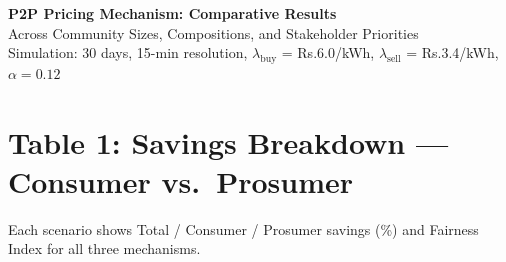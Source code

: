 \documentclass[11pt]{article}
\newcommand{\Rs}{Rs.}
\begin{document}
\begin{center}
{\LARGE \textbf{P2P Pricing Mechanism: Comparative Results}}\\[0.3cm]
{\large Across Community Sizes, Compositions, and Stakeholder Priorities}\\[0.2cm]
{\small Simulation: 30 days, 15-min resolution, $\lambda_{\text{buy}}$ = \Rs 6.0/kWh, $\lambda_{\text{sell}}$ = \Rs 3.4/kWh, $\alpha = 0.12$}
\end{center}

\vspace{0.4cm}

\section*{Table 1: Savings Breakdown --- Consumer vs.\ Prosumer}

{\small Each scenario shows Total / Consumer / Prosumer savings (\%) and Fairness Index for all three mechanisms.}

\vspace{0.3cm}
\end{document}
